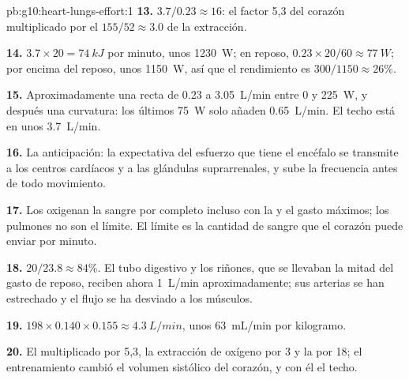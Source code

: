 \begin{solution}{pb:g10:heart-lungs-effort:1}
\textbf{13.} $3.7/0.23 \approx 16$: el factor 5,3 del corazón
multiplicado por el $155/52 \approx 3.0$ de la extracción.

\textbf{14.} $3.7 \times 20 = \qty{74}{kJ}$ por minuto, unos
\qty{1230}{W}; en reposo, $0.23 \times 20/60 \approx \qty{77}{W}$; por
encima del reposo, unos \qty{1150}{W}, así que el rendimiento es
$300/1150 \approx
26\%$.

\textbf{15.} Aproximadamente una recta de \num{0.23} a
\qty{3.05}{L/min} entre 0 y \qty{225}{W}, y después una curvatura: los
últimos \qty{75}{W} solo añaden \qty{0.65}{L/min}. El techo está en
unos \qty{3.7}{L/min}.

\textbf{16.} La anticipación: la expectativa del esfuerzo que tiene el
encéfalo se transmite a los centros cardíacos y a las glándulas
suprarrenales, y sube la frecuencia antes de todo movimiento.

\textbf{17.} Los  oxigenan la sangre por completo incluso con
la  y el gasto máximos; los pulmones no son el límite. El
límite es la cantidad de sangre que el corazón puede enviar por minuto.

\textbf{18.} $20/23.8 \approx 84\%$. El tubo digestivo y los riñones,
que se llevaban la mitad del gasto de reposo, reciben ahora
\qty{1}{L/min} aproximadamente; sus arterias se han estrechado y el
flujo se ha desviado a los músculos.

\textbf{19.} $198 \times 0.140 \times 0.155 \approx \qty{4.3}{L/min}$,
unos \qty{63}{mL/min} por kilogramo.

\textbf{20.} El  multiplicado por 5,3, la extracción de
oxígeno por 3 y la  por 18; el entrenamiento cambió el
volumen sistólico del corazón, y con él el techo.
\end{solution}
